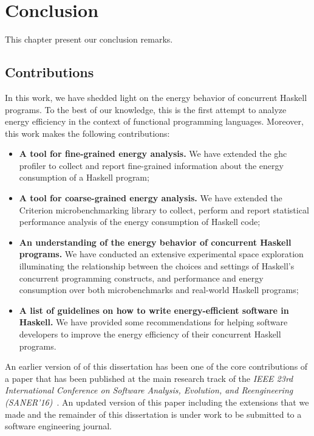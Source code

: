 \chapter{Conclusion}\label{chp:conclusion}
This chapter present our conclusion remarks.

\section{Contributions}
In this work, we have shedded light on the energy behavior of concurrent Haskell programs. To the best of our knowledge, this is the first attempt to analyze energy efficiency in the context of functional programming languages. Moreover, this work makes the following contributions:

\begin{itemize}
  \item \textbf{A tool for fine-grained energy analysis.} We have extended the \acs{ghc} profiler to collect and report fine-grained information about the energy consumption of a Haskell program;
  \item \textbf{A tool for coarse-grained energy analysis.} We have extended the Criterion microbenchmarking library to collect, perform and report statistical performance analysis of the energy consumption of Haskell code;
  \item \textbf{An understanding of the energy behavior of concurrent Haskell programs.} We have conducted an extensive experimental space exploration illuminating the relationship between the choices and settings of Haskell's concurrent programming constructs, and performance and energy consumption over both microbenchmarks and real-world Haskell programs;
  \item \textbf{A list of guidelines on how to write energy-efficient software in Haskell.} We have provided some recommendations for helping software developers to improve the energy efficiency of their concurrent Haskell programs.
\end{itemize}

An earlier version of \textbf{} of this dissertation has been one of the core contributions of a paper that has been published at the main research track of the \emph{IEEE 23rd International Conference on Software Analysis, Evolution, and Reengineering (SANER'16)}~\cite{lima:2016}. An updated version of this paper including the extensions that we made and the remainder of this dissertation is under work to be submitted to a software engineering journal.

